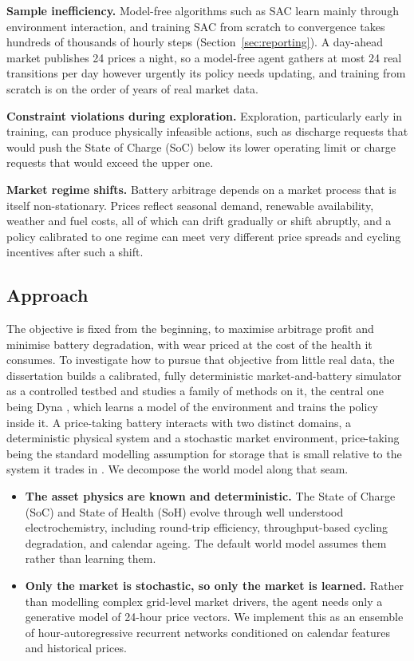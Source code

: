 \documentclass[conference]{IEEEtran}
\begin{document}
\textbf{Sample inefficiency.} Model-free algorithms such as SAC learn mainly through environment interaction, and training SAC from scratch to convergence takes hundreds of thousands of hourly steps (Section~\ref{sec:reporting}). A day-ahead market publishes 24 prices a night, so a model-free agent gathers at most 24 real transitions per day however urgently its policy needs updating, and training from scratch is on the order of years of real market data.

\textbf{Constraint violations during exploration.} Exploration, particularly early in training, can produce physically infeasible actions, such as discharge requests that would push the State of Charge (SoC) below its lower operating limit or charge requests that would exceed the upper one.

\textbf{Market regime shifts.} Battery arbitrage depends on a market process that is itself non-stationary. Prices reflect seasonal demand, renewable availability, weather and fuel costs, all of which can drift gradually or shift abruptly, and a policy calibrated to one regime can meet very different price spreads and cycling incentives after such a shift.

\subsection{Approach}
\label{sec:approach}

The objective is fixed from the beginning, to maximise arbitrage profit and minimise battery degradation, with wear priced at the cost of the health it consumes. To investigate how to pursue that objective from little real data, the dissertation builds a calibrated, fully deterministic market-and-battery simulator as a controlled testbed and studies a family of methods on it, the central one being Dyna \citep{sutton1991dyna}, which learns a model of the environment and trains the policy inside it. A price-taking battery interacts with two distinct domains, a deterministic physical system and a stochastic market environment, price-taking being the standard modelling assumption for storage that is small relative to the system it trades in \citep{sioshansi2009storage}. We decompose the world model along that seam.

\begin{itemize}
\item \textbf{The asset physics are known and deterministic.} The State of Charge (SoC) and State of Health (SoH) evolve through well understood electrochemistry, including round-trip efficiency, throughput-based cycling degradation, and calendar ageing. The default world model assumes them rather than learning them.
\item \textbf{Only the market is stochastic, so only the market is learned.} Rather than modelling complex grid-level market drivers, the agent needs only a generative model of 24-hour price vectors. We implement this as an ensemble of hour-autoregressive recurrent networks conditioned on calendar features and historical prices.
\end{itemize}
\end{document}
